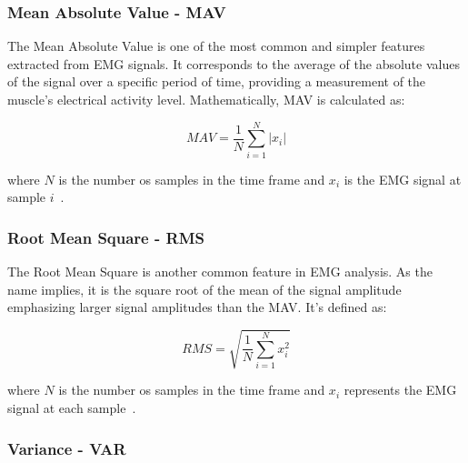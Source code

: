 \subsubsection{Mean Absolute Value - MAV} 
\label{sssec:mean_absolute_value}

The Mean Absolute Value is one of the most common and simpler features extracted from \gls{EMG} signals. It corresponds to the average of the absolute values of the signal over a specific period of time, providing a measurement of the 
muscle's electrical activity level. 
Mathematically, MAV is calculated as:

\begin{equation}
  MAV = \frac{1}{N} \sum_{i=1}^{N} \left\lvert x_i \right\rvert 
  \label{eq:mavEQ}
\end{equation}

where $N$ is the number os samples in the time frame and $x_i$ is the \gls{EMG} signal at sample $i$~\cite{HandGestureRecognition, ComprehensiveStudyOnEMG, BiomedicalSignalProcessingAndControl, Review_IRBM_EMG, ReviewOfEMGSignalClassification, Hybrid}.



\subsubsection{Root Mean Square - RMS} 
\label{sssec:root_mean_square}

The Root Mean Square is another common feature in EMG analysis. As the name implies, it is the square root of the mean of the signal amplitude emphasizing larger signal amplitudes than the MAV. It's defined as:

\begin{equation}
  RMS = \sqrt{\frac{1}{N} \sum_{i=1}^{N} x_i^2}
  \label{eq:rmsEQ}
\end{equation}

where $N$ is the number os samples in the time frame and $x_i$ represents the \gls{EMG} signal at each sample~\cite{HandGestureRecognition, BiomedicalSignalProcessingAndControl, MeasuringSurfaceElectromyographyWithTextileElectrodes, Review_IRBM_EMG, ReviewOfEMGSignalClassification, Hybrid}.

\subsubsection{Variance - VAR} %
\label{sssec:variance}

